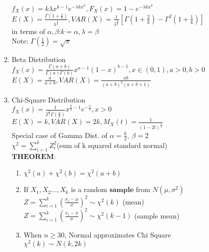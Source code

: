 \documentclass[10pt]{article}
\begin{document}
\begin{multicols}{2}
\begin{enumerate}
\begin{enumerate}
				$f_X(x) = k\lambda x^{k-1}e^{-\lambda kx^k}, F_X(x) = 1 - e^{-\lambda kx^k}$\\
				$E(X) = \frac{\Gamma(1+\frac{1}{k})}{\lambda^{\frac{1}{k}}}, VAR(X) = \frac{1}{\lambda^{\frac{2}{k}}}[\Gamma(1+\frac{2}{k}) - \Gamma^2(1+\frac{1}{k})]$\\
				in terms of $\alpha, \beta$:$k = \alpha, \lambda = \beta$\\
				Note: $\Gamma(\frac{1}{2}) = \sqrt{\pi}$
				\item Beta Distribution\\
				$f_X(x) = \frac{\Gamma(a + b)}{\Gamma(a)\Gamma(b)}x^{a-1}(1-x)^{b-1}, x \in (0,1), a>0, b>0$\\
				$E(X) = \frac{a}{a+b}, VAR(X) = \frac{ab}{(a+b)^2(a+b+1)}$
				\item Chi-Square Distribution\\
				$f_X(x) = \frac{1}{2^{\frac{k}{2}}\Gamma(\frac{k}{2})}x^{\frac{k}{2}-1}e^{-\frac{x}{2}}, x > 0$\\
				$E(X) = k, VAR(X) = 2k, M_X(t) = \frac{1}{(1-2t)^{\frac{k}{2}}}$\\
				Special case of Gamma Dist. of $\alpha = \frac{k}{2}, \ \beta = 2$\\
				$\chi^2 = \sum_{i = 1}^{k}Z_i^2$(sum of k squared standard normal)\\
				$\textbf{THEOREM}$:
				\begin{enumerate}
					\item $\chi^2(a) + \chi^2(b) = \chi^2(a+b)$
					\item If $X_1, X_2 \dots, X_k$ is a random $\textbf{sample}$ from $N(\mu, \sigma^2)$\\
					$Z = \sum_{i = 1}^{k}(\frac{x_i-\mu}{\sigma})^2 \sim \chi^2(k)$ (mean)\\
					$Z = \sum_{i = 1}^{k}(\frac{x_i-\bar x}{\sigma})^2 \sim \chi^2(k-1)$ (sample mean)
					\item When $n \ge 30$, Normal approximates Chi Square\\
					$\chi^2(k) \sim N(k,2k)$
				\end{enumerate}
			\end{enumerate}
			

\end{enumerate}
\end{multicols}
\end{document}
